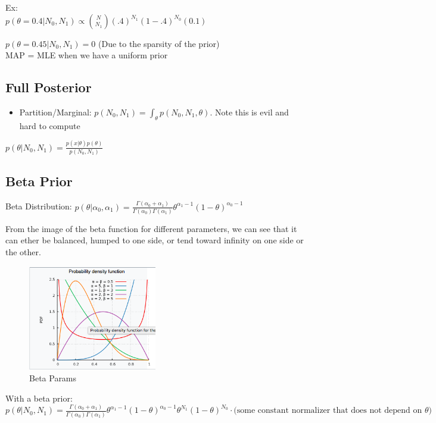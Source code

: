 \documentclass[twoside]{article}
\begin{document}
Ex:\\
$p(\theta=0.4|N_0,N_1) \propto {N \choose N_1} (.4)^{N_1}(1-.4)^{N_0} (0.1)$

$p(\theta=0.45|N_0,N_1) = 0 $ (Due to the sparsity of the prior)\\

MAP = MLE when we have a uniform prior

\subsection{Full Posterior}

\begin{itemize}
\item Partition/Marginal: $p(N_0,N_1) = \int_\theta p(N_0,N_1,\theta)$. Note this is evil and hard to compute
\end{itemize}
$p(\theta|N_0,N_1) = \frac{p(x|\theta) p(\theta)}{p(N_0,N_1)}$

\subsection{Beta Prior}

Beta Distribution: $p(\theta|\alpha_0,\alpha_1) = \frac{\Gamma(\alpha_0 + \alpha_1)}{\Gamma(\alpha_0)\Gamma(\alpha_1)} \theta^{\alpha_1-1} (1-\theta)^{\alpha_0-1}$ 

From the image of the beta function for different parameters, we can see that it can ether be balanced, humped to one side, or tend toward infinity on one side or the other.
\begin{figure}
\centering
\includegraphics[width=0.5\textwidth]{beta}
\caption{Beta Params}
\end{figure}

With a beta prior:  $p(\theta|N_0,N_1) = \frac{\Gamma(\alpha_0 + \alpha_1)}{\Gamma(\alpha_0)\Gamma(\alpha_1)} \theta^{\alpha_1-1} (1-\theta)^{\alpha_0-1} \theta^{N_1}(1-\theta)^{N_0} \cdot \textrm{(some constant normalizer that does not depend on } \theta) $
\end{document}
